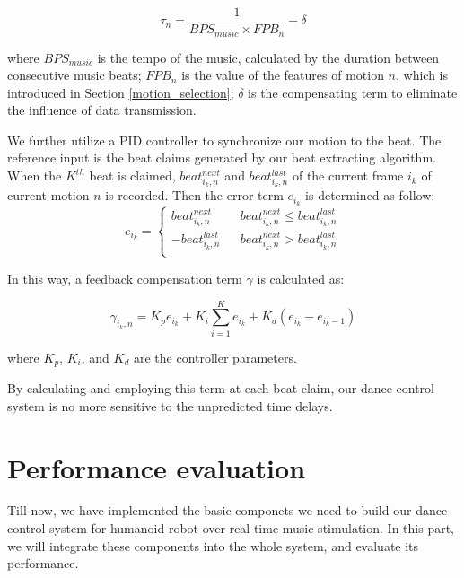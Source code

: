 \documentclass[UTF8,a4paper]{article}
\begin{document}
	\begin{equation}
		\tau_n = \frac{1}{BPS_{music} \times FPB_n} - \delta
	\end{equation}

	where $BPS_{music}$ is the tempo of the music, calculated by the duration between consecutive music beats; $FPB_n$ is the value of the features of motion $n$, which is introduced in Section \ref{motion_selection}; $\delta$ is the compensating term to eliminate the influence of data transmission.

	We further utilize a PID controller to synchronize our motion to the beat. The reference input is the beat claims generated by our beat extracting algorithm. When the $K^{th}$ beat is claimed, $beat^{next}_{i_k,n}$ and $beat^{last}_{i_k,n}$ of the current frame $i_k$ of current motion $n$ is recorded. Then the error term $e_{i_k}$ is determined as follow:
	\begin{equation}
		e_{i_k}=\left\{
			\begin{array}{rcl}
				beat^{next}_{i_k,n}       &      & {beat^{next}_{i_k,n} \leq beat^{last}_{i_k,n}}\\
				-beat^{last}_{i_k,n}     &      & {beat^{next}_{i_k,n} > beat^{last}_{i_k,n}}\\
			\end{array} \right. 
	\end{equation}

	In this way, a feedback compensation term $\gamma$ is calculated as:

	\begin{equation}
		\gamma_{i_k, n} = K_p e_{i_k} + K_i\sum_{i=1}^K e_{i_k} + K_d(e_{i_k}-e_{i_k-1})
	\end{equation}

	where $K_p$, $K_i$, and $K_d$ are the controller parameters.

	By calculating and employing this term at each beat claim, our dance control system is no more sensitive to the unpredicted time delays.

	\section{Performance evaluation}\label{section3}

	\noindent Till now, we have implemented the basic componets we need to build our dance control system for humanoid robot over real-time music stimulation. In this part, we will integrate these components into the whole system, and evaluate its performance.
\end{document}
